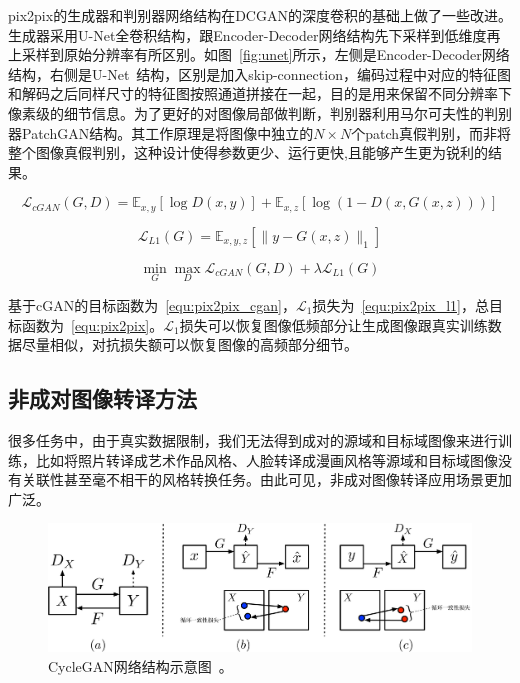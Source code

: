 pix2pix的生成器和判别器网络结构在DCGAN的深度卷积的基础上做了一些改进。生成器采用U-Net全卷积结构，跟Encoder-Decoder网络结构先下采样到低维度再上采样到原始分辨率有所区别。如图~\ref{fig:unet}所示，左侧是Encoder-Decoder网络结构，右侧是U-Net~\cite{ronneberger2015u}结构，区别是加入skip-connection，编码过程中对应的特征图和解码之后同样尺寸的特征图按照通道拼接在一起，目的是用来保留不同分辨率下像素级的细节信息。为了更好的对图像局部做判断，判别器利用马尔可夫性的判别器PatchGAN结构。其工作原理是将图像中独立的$N \times N$个patch真假判别，而非将整个图像真假判别，这种设计使得参数更少、运行更快,且能够产生更为锐利的结果。

\begin{equation}
\label{equ:pix2pix_cgan}
\mathcal{L}_{cGAN}(G,D) = \mathbb{E}_{x,y}[\log D(x,y)] + \mathbb{E}_{x,z}[\log(1-D(x,G(x,z)))]
\end{equation}

\begin{equation}
\label{equ:pix2pix_l1}
\mathcal{L}_{L1}(G) = \mathbb{E}_{x,y,z}[\parallel y-G(x,z) \parallel_1]
\end{equation}

\begin{equation}
\label{equ:pix2pix}
\min \limits_G \max \limits_D \mathcal{L}_{cGAN}(G,D) + \lambda \mathcal{L}_{L1}(G)
\end{equation}

基于cGAN的目标函数为~\ref{equ:pix2pix_cgan}，$\mathcal{L}_1$损失为~\ref{equ:pix2pix_l1}，总目标函数为~\ref{equ:pix2pix}。$\mathcal{L}_1$损失可以恢复图像低频部分让生成图像跟真实训练数据尽量相似，对抗损失额可以恢复图像的高频部分细节。


\subsection{非成对图像转译方法}
很多任务中，由于真实数据限制，我们无法得到成对的源域和目标域图像来进行训练，比如将照片转译成艺术作品风格、人脸转译成漫画风格等源域和目标域图像没有关联性甚至毫不相干的风格转换任务。由此可见，非成对图像转译应用场景更加广泛。

\begin{figure}[ht]
    \centering
	\includegraphics[width=\textwidth]{figures/cyclegan.pdf}
	\caption{CycleGAN网络结构示意图~\cite{zhu2017unpaired}。}
	\label{fig:cyclegan}
\end{figure}

